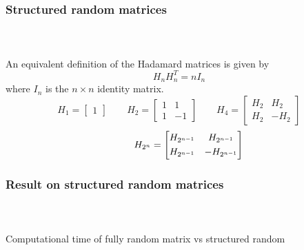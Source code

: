 \begin{frame}[t]
	\frametitle{Structured random matrices}
	\framesubtitle{~~}  %
	An equivalent definition of the Hadamard matrices is given by 
	$$ H_{n}H_{n}^T=nI_{n} $$
	where $I_{n}$ is the $n \times n$ identity matrix.
$$
	H_{1} = \begin{bmatrix}
		1
		\end{bmatrix}
\qquad
    H_{2} = \begin{bmatrix}
 		1 & 1           \\[0.3em]
		1& -1
			\end{bmatrix}	
\qquad
	H_{4} = \begin{bmatrix}
		H_{2} & H_{2}           \\[0.3em]
		H_{2}& -H_{2}
	\end{bmatrix}	
$$
$$
\centering
\qquad
H_{2^{n}} = \begin{bmatrix}
H_{2^{n-1}} & H_{2^{n-1}}           \\[0.3em]
H_{2^{n-1}}& -H_{2^{n-1}}            
\end{bmatrix}	
$$
\end{frame}

\begin{frame}[t]
	\frametitle{Result on structured random matrices}
	\framesubtitle{~~}  %
	
	Computational time of fully random matrix vs structured random
	
\end{frame}




        
